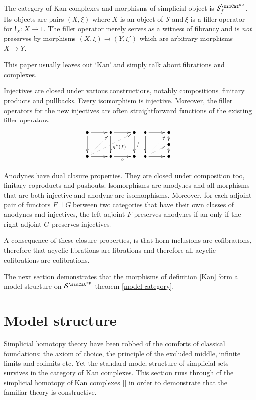\documentclass{tac}
\newcommand\cat\mathcal
\newcommand\ri{^*}
\newcommand\dual{^{\mathrm{op}}}
\newcommand\s{^{\simCat\dual}}
\newcommand\bang{!}
\newcommand\of{:}
\newcommand\f{_f}
\newcommand\citep[1]{[\cite{#1}]}
\begin{document}
\begin{definition}
The category of Kan complexes and morphisms of simplicial object is $\cat S\s\f$. Its objects are pairs $(X,\xi)$ where $X$ is an object of $\cat S$ and $\xi$ is a filler operator for $\bang_X\of X\to 1$. The filler operator merely serves as a witness of fibrancy and is \emph{not} preserves by morphisms $(X,\xi)\to(Y,\xi')$ which are arbitrary morphisms $X\to Y$.
\end{definition}
This paper usually leaves out `Kan' and simply talk about fibrations and complexes. 

\begin{remark}[Saturation] Injectives are closed under various constructions, notably compositions, finitary products and pullbacks. Every isomorphism is injective. Moreover, the filler operators for the new injectives are often straightforward functions of the existing filler operators.
\[
\xy
(0,12)*+{\bullet}="a",(12,12)*+{\bullet}="b",(24,12)*+{\bullet}="c",
(0,0)*+{\bullet}="d",(12,0)*+{\bullet}="e",(24,0)*+{\bullet}="f",
\ar "a";"b" \ar "b";"c" \ar "a";"d" \ar^(.6){g\ri(f)} "b";"e" \ar^f "c";"f" \ar "d";"e" \ar_g "e";"f"
\ar@{.>} "d";"c" \ar@{.>} "d";"b"
\endxy
\xy
(0,12)*+{\bullet}="a",(12,12)*+{\bullet}="b",(12,6)*+{\bullet}="c",(0,0)*+{\bullet}="d",(12,0)*+{\bullet}="e"
\ar "a";"b" \ar "a";"d" \ar "b";"c" \ar "c";"e" \ar "d";"e" \ar@{.>} "d";"b" \ar@{.>} "d";"c"
\endxy
\]


Anodynes have dual closure properties. They are closed under composition too, finitary coproducts and pushouts. Isomorphisms are anodynes and all morphisms that are both injective and anodyne are isomorphisms. Moreover, for each adjoint pair of functors $F\dashv G$ between two categories that have their own classes of anodynes and injectives, the left adjoint $F$ preserves anodynes if an only if the right adjoint $G$ preserves injectives.

A consequence of these closure properties, is that horn inclusions are cofibrations, therefore that acyclic fibrations are fibrations and therefore all acyclic cofibrations are cofibrations.
\end{remark}

The next section demonstrates that the morphisms of definition \ref{Kan} form a model structure on $\cat S\s$ theorem \ref{model category}.

\section{Model structure}
Simplicial homotopy theory have been robbed of the comforts of classical foundations: the axiom of choice, the principle of the excluded middle, infinite limits and colimits etc. Yet the standard model structure of simplicial sets survives in the category of Kan complexes. This section runs through of the simplicial homotopy of Kan complexes \citep{Hovey99,GJSHT} in order to demonstrate that the familiar theory is constructive.
\end{document}
